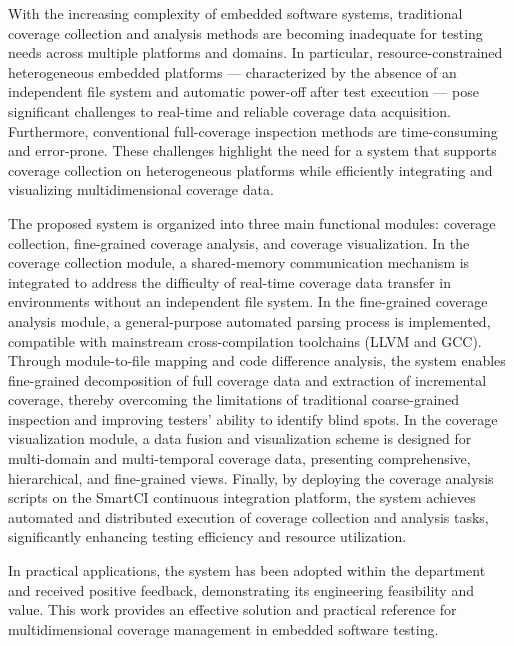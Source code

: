 \begin{abstract*}
    With the increasing complexity of embedded software systems, traditional coverage collection and analysis methods are becoming inadequate for testing needs across multiple platforms and domains. In particular, resource-constrained heterogeneous embedded platforms — characterized by the absence of an independent file system and automatic power-off after test execution — pose significant challenges to real-time and reliable coverage data acquisition. Furthermore, conventional full-coverage inspection methods are time-consuming and error-prone. These challenges highlight the need for a system that supports coverage collection on heterogeneous platforms while efficiently integrating and visualizing multidimensional coverage data.

    The proposed system is organized into three main functional modules: coverage collection, fine-grained coverage analysis, and coverage visualization. In the coverage collection module, a shared-memory communication mechanism is integrated to address the difficulty of real-time coverage data transfer in environments without an independent file system. In the fine-grained coverage analysis module, a general-purpose automated parsing process is implemented, compatible with mainstream cross-compilation toolchains (LLVM and GCC). Through module-to-file mapping and code difference analysis, the system enables fine-grained decomposition of full coverage data and extraction of incremental coverage, thereby overcoming the limitations of traditional coarse-grained inspection and improving testers’ ability to identify blind spots. In the coverage visualization module, a data fusion and visualization scheme is designed for multi-domain and multi-temporal coverage data, presenting comprehensive, hierarchical, and fine-grained views. Finally, by deploying the coverage analysis scripts on the SmartCI continuous integration platform, the system achieves automated and distributed execution of coverage collection and analysis tasks, significantly enhancing testing efficiency and resource utilization.

    In practical applications, the system has been adopted within the department and received positive feedback, demonstrating its engineering feasibility and value. This work provides an effective solution and practical reference for multidimensional coverage management in embedded software testing.

\end{abstract*}
